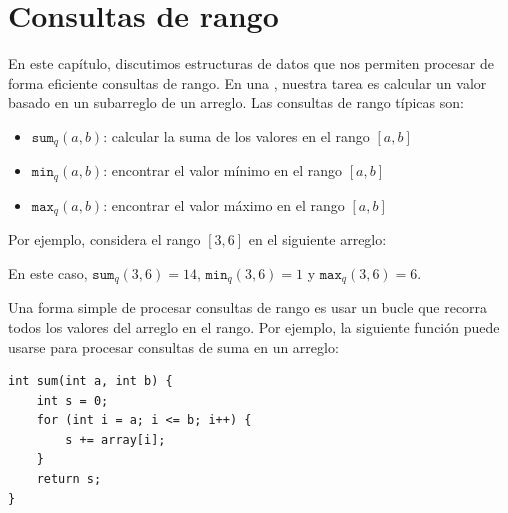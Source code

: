 \chapter{Consultas de rango}


En este capítulo, discutimos estructuras de datos
que nos permiten procesar de forma eficiente consultas de rango.
En una ,
nuestra tarea es calcular un valor
basado en un subarreglo de un arreglo.
Las consultas de rango típicas son:
\begin{itemize}
\item $\texttt{sum}_q(a,b)$: calcular la suma de los valores en el rango $[a,b]$
\item $\texttt{min}_q(a,b)$: encontrar el valor mínimo en el rango $[a,b]$
\item $\texttt{max}_q(a,b)$: encontrar el valor máximo en el rango $[a,b]$
\end{itemize}

Por ejemplo, considera el rango $[3,6]$ en el siguiente arreglo:
\begin{center}
\end{center}
En este caso, $\texttt{sum}_q(3,6)=14$,
$\texttt{min}_q(3,6)=1$ y $\texttt{max}_q(3,6)=6$.

Una forma simple de procesar consultas de rango es usar
un bucle que recorra todos los valores del arreglo en el rango.
Por ejemplo, la siguiente función puede
usarse para procesar consultas de suma en un arreglo:

\begin{lstlisting}
int sum(int a, int b) {
    int s = 0;
    for (int i = a; i <= b; i++) {
        s += array[i];
    }
    return s;
}
\end{lstlisting}

